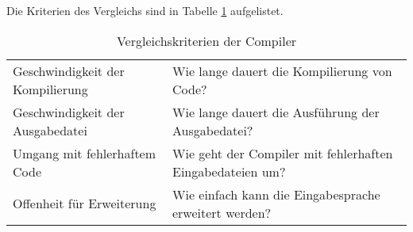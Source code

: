 Die Kriterien des Vergleichs sind in Tabelle \ref{tab:criteria} aufgelistet.

\begin{table}[H]
    \centering
    \caption{Vergleichskriterien der Compiler}
    \label{tab:criteria}
    \vspace{3mm} %

    \begin{tabular}{l|l}
    Geschwindigkeit der Kompilierung    & Wie lange dauert die Kompilierung von Code?                       \\
    Geschwindigkeit der Ausgabedatei    & Wie lange dauert die Ausführung der Ausgabedatei?                 \\
    Umgang mit fehlerhaftem Code        & Wie geht der Compiler mit fehlerhaften Eingabedateien um?         \\
    Offenheit für Erweiterung           & Wie einfach kann die Eingabesprache erweitert werden?                                 
    \end{tabular}
\end{table}

